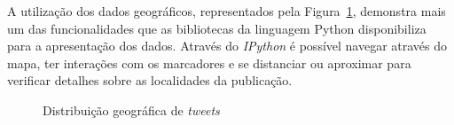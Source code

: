 A utilização dos dados geográficos, representados pela Figura~\ref{fig:mapa}, demonstra mais um das funcionalidades que as bibliotecas da linguagem Python disponibiliza para a apresentação dos dados. Através do \textit{IPython} é possível navegar através do mapa, ter interações com os marcadores e se distanciar ou aproximar para verificar detalhes sobre as localidades da publicação.

\begin{figure}[h]
	\centering
	\vspace{-0.2cm}
	\caption{Distribuição geográfica de \textit{tweets}}
	\label{fig:mapa}
\end{figure}

\begin{grafico}[h!]
	\centering
	\vspace{-0.2cm}
	\caption{Publicação de \textit{tweets} por hora}
	\label{time}
\end{grafico}


